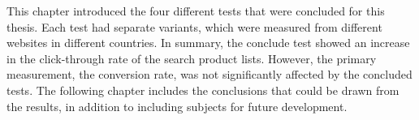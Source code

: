 This chapter introduced the four different tests that were concluded for this thesis.
Each test had separate variants, which were measured from different websites in different countries.
In summary, the conclude test showed an increase in the click-through rate of the search product lists. 
However, the primary measurement, the conversion rate, was not significantly affected by the concluded tests.
The following chapter includes the conclusions that could be drawn from the results, in addition to including
subjects for future development.








